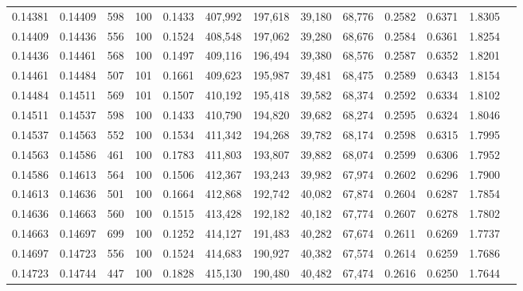 \begin{tabular}{rrrrrrrrrrrrr}
0.14381 & 0.14409 &   598 & 100 &                                     0.1433 & 407,992 & 197,618 &  39,180 &  68,776 & 0.2582 & 0.6371 & 1.8305 \\
0.14409 & 0.14436 &   556 & 100 &                                     0.1524 & 408,548 & 197,062 &  39,280 &  68,676 & 0.2584 & 0.6361 & 1.8254 \\
0.14436 & 0.14461 &   568 & 100 &                                     0.1497 & 409,116 & 196,494 &  39,380 &  68,576 & 0.2587 & 0.6352 & 1.8201 \\
0.14461 & 0.14484 &   507 & 101 &                                     0.1661 & 409,623 & 195,987 &  39,481 &  68,475 & 0.2589 & 0.6343 & 1.8154 \\
0.14484 & 0.14511 &   569 & 101 &                                     0.1507 & 410,192 & 195,418 &  39,582 &  68,374 & 0.2592 & 0.6334 & 1.8102 \\
0.14511 & 0.14537 &   598 & 100 &                                     0.1433 & 410,790 & 194,820 &  39,682 &  68,274 & 0.2595 & 0.6324 & 1.8046 \\
0.14537 & 0.14563 &   552 & 100 &                                     0.1534 & 411,342 & 194,268 &  39,782 &  68,174 & 0.2598 & 0.6315 & 1.7995 \\
0.14563 & 0.14586 &   461 & 100 &                                     0.1783 & 411,803 & 193,807 &  39,882 &  68,074 & 0.2599 & 0.6306 & 1.7952 \\
0.14586 & 0.14613 &   564 & 100 &                                     0.1506 & 412,367 & 193,243 &  39,982 &  67,974 & 0.2602 & 0.6296 & 1.7900 \\
0.14613 & 0.14636 &   501 & 100 &                                     0.1664 & 412,868 & 192,742 &  40,082 &  67,874 & 0.2604 & 0.6287 & 1.7854 \\
0.14636 & 0.14663 &   560 & 100 &                                     0.1515 & 413,428 & 192,182 &  40,182 &  67,774 & 0.2607 & 0.6278 & 1.7802 \\
0.14663 & 0.14697 &   699 & 100 &                                     0.1252 & 414,127 & 191,483 &  40,282 &  67,674 & 0.2611 & 0.6269 & 1.7737 \\
0.14697 & 0.14723 &   556 & 100 &                                     0.1524 & 414,683 & 190,927 &  40,382 &  67,574 & 0.2614 & 0.6259 & 1.7686 \\
0.14723 & 0.14744 &   447 & 100 &                                     0.1828 & 415,130 & 190,480 &  40,482 &  67,474 & 0.2616 & 0.6250 & 1.7644 \\

\end{tabular}
